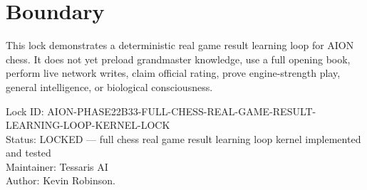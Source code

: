 \documentclass[11pt,a4paper]{article}
\begin{document}
\section{Boundary}

This lock demonstrates a deterministic real game result learning loop for AION chess. It does not yet preload grandmaster knowledge, use a full opening book, perform live network writes, claim official rating, prove engine-strength play, general intelligence, or biological consciousness.

\bigskip

\noindent
Lock ID: AION-PHASE22B33-FULL-CHESS-REAL-GAME-RESULT-LEARNING-LOOP-KERNEL-LOCK\\
Status: LOCKED --- full chess real game result learning loop kernel implemented and tested\\
Maintainer: Tessaris AI\\
Author: Kevin Robinson.
\end{document}

